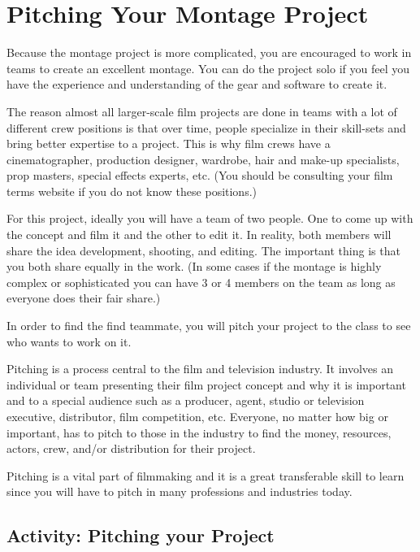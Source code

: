\documentclass[
  letterpaper,
  DIV=11,
  numbers=noendperiod]{scrreprt}
\begin{document}
\section{Pitching Your Montage
Project}\label{pitching-your-montage-project}

Because the montage project is more complicated, you are encouraged to
work in teams to create an excellent montage. You can do the project
solo if you feel you have the experience and understanding of the gear
and software to create it.

The reason almost all larger-scale film projects are done in teams with
a lot of different crew positions is that over time, people specialize
in their skill-sets and bring better expertise to a project. This is why
film crews have a cinematographer, production designer, wardrobe, hair
and make-up specialists, prop masters, special effects experts, etc.
(You should be consulting your film terms website if you do not know
these positions.)

For this project, ideally you will have a team of two people. One to
come up with the concept and film it and the other to edit it. In
reality, both members will share the idea development, shooting, and
editing. The important thing is that you both share equally in the work.
(In some cases if the montage is highly complex or sophisticated you can
have 3 or 4 members on the team as long as everyone does their fair
share.)

In order to find the find teammate, you will pitch your project to the
class to see who wants to work on it.

Pitching is a process central to the film and television industry. It
involves an individual or team presenting their film project concept and
why it is important and to a special audience such as a producer, agent,
studio or television executive, distributor, film competition, etc.
Everyone, no matter how big or important, has to pitch to those in the
industry to find the money, resources, actors, crew, and/or distribution
for their project.

Pitching is a vital part of filmmaking and it is a great transferable
skill to learn since you will have to pitch in many professions and
industries today.

\subsection{Activity: Pitching your
Project}\label{activity-pitching-your-project}
\end{document}
